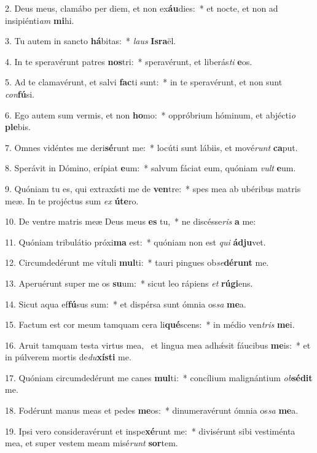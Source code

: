 2. Deus meus, clamábo per diem, et non ex\textbf{áu}dies:~*  et nocte, et non ad insipiénti\textit{am} \textbf{mi}hi.\

3. Tu autem in sancto \textbf{há}bitas:~*  \textit{laus} \textbf{Is}\textbf{ra}ël.\

4. In te speravérunt patres \textbf{nos}tri:~*  speravérunt, et liberás\textit{ti} \textbf{e}os.\

5. Ad te clamavérunt, et salvi \textbf{fac}ti sunt:~*  in te speravérunt, et non sunt \textit{con}\textbf{fú}si.\

6. Ego autem sum vermis, et non \textbf{ho}mo:~*  oppróbrium hóminum, et abjécti\textit{o} \textbf{ple}bis.\

7. Omnes vidéntes me deri\textbf{sé}runt me:~*  locúti sunt lábiis, et mové\textit{runt} \textbf{ca}put.\

8. Sperávit in Dómino, erípiat \textbf{e}um:~*  salvum fáciat eum, quóniam \textit{vult} \textbf{e}um.\

9. Quóniam tu es, qui extraxísti me de \textbf{ven}tre:~*  spes mea ab ubéribus matris meæ. In te projéctus sum \textit{ex} \textbf{ú}\textbf{te}ro.\

10. De ventre matris meæ Deus meus \textbf{es} tu,~*  ne discésse\textit{ris} \textbf{a} me:\

11. Quóniam tribulátio próxi\textbf{ma} est:~*  quóniam non est \textit{qui} \textbf{ád}\textbf{ju}vet.\

12. Circumdedérunt me vítuli \textbf{mul}ti:~*  tauri pingues ob\textit{se}\textbf{dé}\textbf{runt} me.\

13. Aperuérunt super me os \textbf{su}um:~*  sicut leo rápiens \textit{et} \textbf{rú}\textbf{gi}ens.\

14. Sicut aqua ef\textbf{fú}sus sum:~*  et dispérsa sunt ómnia os\textit{sa} \textbf{me}a.\

15. Factum est cor meum tamquam cera li\textbf{qué}scens:~*  in médio ven\textit{tris} \textbf{me}i.\

16. Aruit tamquam testa virtus mea, \dag\  et lingua mea adhǽsit fáucibus \textbf{me}is:~*  et in púlverem mortis de\textit{du}\textbf{xís}\textbf{ti} me.\

17. Quóniam circumdedérunt me canes \textbf{mul}ti:~*  concílium malignántium \textit{ob}\textbf{sé}\textbf{dit} me.\

18. Fodérunt manus meas et pedes \textbf{me}os:~*  dinumeravérunt ómnia os\textit{sa} \textbf{me}a.\

19. Ipsi vero consideravérunt et inspe\textbf{xé}runt me:~*  divisérunt sibi vestiménta mea, et super vestem meam misé\textit{runt} \textbf{sor}tem.\

